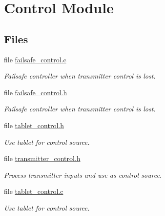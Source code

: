 \hypertarget{group___control}{\section{Control Module}
\label{group___control}
}
\subsection*{Files}
\begin{DoxyCompactItemize}
\item 
file \hyperlink{failsafe__control_8c}{failsafe\-\_\-control.\-c}
\begin{DoxyCompactList}\small\item\em Failsafe controller when transmitter control is lost. \end{DoxyCompactList}\item 
file \hyperlink{failsafe__control_8h}{failsafe\-\_\-control.\-h}
\begin{DoxyCompactList}\small\item\em Failsafe controller when transmitter control is lost. \end{DoxyCompactList}\item 
file \hyperlink{tablet__control_8h}{tablet\-\_\-control.\-h}
\begin{DoxyCompactList}\small\item\em Use tablet for control source. \end{DoxyCompactList}\item 
file \hyperlink{transmitter__control_8h}{transmitter\-\_\-control.\-h}
\begin{DoxyCompactList}\small\item\em Process transmitter inputs and use as control source. \end{DoxyCompactList}\item 
file \hyperlink{tablet__control_8c}{tablet\-\_\-control.\-c}
\begin{DoxyCompactList}\small\item\em Use tablet for control source. \end{DoxyCompactList}\end{DoxyCompactItemize}
